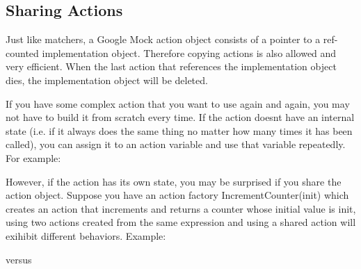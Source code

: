 \subsection*{Sharing Actions}

Just like matchers, a Google Mock action object consists of a pointer to a ref-\/counted implementation object. Therefore copying actions is also allowed and very efficient. When the last action that references the implementation object dies, the implementation object will be deleted.

If you have some complex action that you want to use again and again, you may not have to build it from scratch every time. If the action doesn\textquotesingle{}t have an internal state (i.\+e. if it always does the same thing no matter how many times it has been called), you can assign it to an action variable and use that variable repeatedly. For example\+:


\begin{DoxyCode}{0}
\end{DoxyCode}


However, if the action has its own state, you may be surprised if you share the action object. Suppose you have an action factory {\ttfamily Increment\+Counter(init)} which creates an action that increments and returns a counter whose initial value is {\ttfamily init}, using two actions created from the same expression and using a shared action will exihibit different behaviors. Example\+:


\begin{DoxyCode}{0}
\end{DoxyCode}


versus


\begin{DoxyCode}{0}
\DoxyCodeLine{}
\end{DoxyCode}


